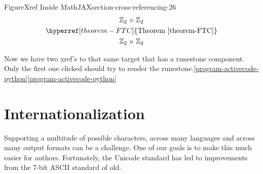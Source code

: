 \documentclass{sn-jnl}
\theoremstyle{thmstyleone}%
\theoremstyle{thmstyletwo}%
\theoremstyle{thmstylethree}%
\newcommand{\xreffont}{\relax}
\numberwithin{equation}{section}
\begin{document}
\begin{figureptx}{Figure}{Xref Inside MathJAX}{section-cross-referencing-26}{}%
\centering
%
\begin{gather*}
{\mathbb Z}_2 \times {\mathbb Z}_2\\
\hyperref[theorem-FTC]{\text{Theorem {\xreffont\ref{theorem-FTC}}}}\\
{\mathbb Z}_2 \times {\mathbb Z}_2
\end{gather*}
%
\tcblower
\end{figureptx}%
Now we have two xref's to that same target that has a runestone component. Only the first one clicked should try to render the runestone.\hyperref[program-activecode-python]{{\xreffont\ref{program-activecode-python}}}\hyperref[program-activecode-python]{{\xreffont\ref{program-activecode-python}}}%
%
%
\typeout{************************************************}
\typeout{************************************************}
%
\section{Internationalization}\label{section-internationalization}%
%
Supporting a multitude of possible characters, across many languages and across many output formats can be a challenge.  One of our goals is to make this much easier for authors.  Fortunately, the Unicode standard has led to improvements from the 7-bit ASCII standard of old.%
\end{document}

